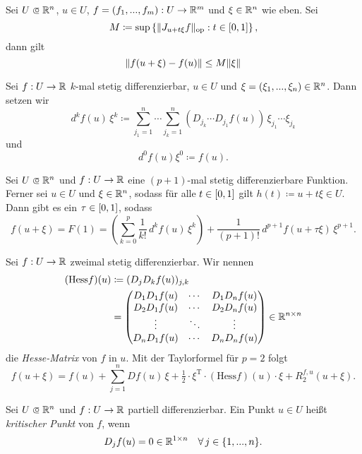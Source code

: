 \documentclass{cheat-sheet}
\begin{document}
\begin{kor}[Schrankensatz]
Sei $U \opn \R^n$, $u \in U$, $f = (f_1, ..., f_m) : U \to \mathbb{R}^m$ und $\xi \in \mathbb{R}^n$ wie eben. Sei
\[ M \coloneqq \sup \left\{ \lVert J_{u + t \xi} f\rVert_{\text{op}} : t \in \left[ 0, 1 \right] \right\}, \]
dann gilt
\[ \lVert f(u + \xi) - f(u)\rVert \le M \lVert\xi\rVert \]
\end{kor}

\begin{nota}
Sei $f : U \to \mathbb{R}$ $k$-mal stetig differenzierbar, $u \in U$ und $\xi = (\xi_1, ..., \xi_n) \in \mathbb{R}^n$. Dann setzen wir
\[ d^k f(u)\,\xi^k \coloneqq \sum_{j_1=1}^n \cdots \sum_{j_k=1}^n (D_{j_k} \cdots D_{j_1} f(u))\,\xi_{j_1}\cdots\xi_{j_k} \]
und
\[ d^0 f(u) \xi^0 \coloneqq f(u). \]
\end{nota}

\begin{satz}
Sei $U \opn \R^n$ und $f : U \to \mathbb{R}$ eine $(p + 1)$-mal stetig differenzierbare Funktion. Ferner sei $u \in U$ und $\xi \in \mathbb{R}^n$, sodass für alle $t \in \left[ 0, 1 \right]$ gilt $h(t) \coloneqq u + t \xi \in U$. Dann gibt es ein $\tau \in \left[ 0, 1 \right]$, sodass
\[ f(u + \xi) = F(1) = \left( \sum_{k=0}^{p} \frac{1}{k!}\,d^k f(u)\,\xi^k \right) + \frac{1}{(p + 1)!}\,d^{p+1} f(u + \tau \xi)\,\xi^{p+1}. \]
\end{satz}

\begin{bem}[Taylorformel für $p = 2$]
Sei $f : U \to \mathbb{R}$ zweimal stetig differenzierbar. Wir nennen
\begin{align*}
  (\mathrm{Hess} f)(u) &\coloneqq (D_j D_k f(u))_{j,k}\\
  &= \begin{pmatrix} D_1 D_1 f(u) & \cdots & D_1 D_n f(u) \\ D_2 D_1 f(u) & \cdots & D_2 D_n f(u) \\ \vdots & \ddots & \vdots \\ D_n D_1 f(u) & \cdots & D_n D_n f(u) \end{pmatrix} \in \mathbb{R}^{n \times n}
\end{align*}
die \emph{Hesse-Matrix} von $f$ in $u$. Mit der Taylorformel für $p = 2$ folgt
\[ f(u + \xi) = f(u) + \sum_{j=1}^{n} D f(u)\,\xi + \tfrac{1}{2} \cdot \xi^{\text{T}} \cdot (\mathrm{Hess} f)(u) \cdot \xi + R_2^{f,u}(u + \xi). \]
\end{bem}

\begin{defn}
Sei $U \opn \R^n$ und $f : U \to \mathbb{R}$ partiell differenzierbar. Ein Punkt $u \in U$ heißt \emph{kritischer Punkt} von $f$, wenn
\[ D_j f(u) = 0 \in \mathbb{R}^{1 \times n}\quad \forall\,j \in \{ 1, ..., n \}. \]
\end{defn}
\end{document}
